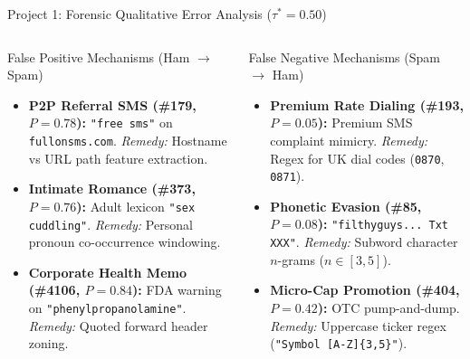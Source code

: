 \documentclass[aspectratio=169,10pt]{beamer}
\begin{document}
\begin{frame}{Project 1: Forensic Qualitative Error Analysis ($\tau^*=0.50$)}
\begin{columns}
\begin{block}{False Positive Mechanisms (Ham $\to$ Spam)}
\scriptsize
\begin{itemize}
  \item \textbf{P2P Referral SMS (\#179, $P=0.78$):} \texttt{"free sms"} on \texttt{fullonsms.com}. \textit{Remedy:} Hostname vs URL path feature extraction.
  \item \textbf{Intimate Romance (\#373, $P=0.76$):} Adult lexicon \texttt{"sex cuddling"}. \textit{Remedy:} Personal pronoun co-occurrence windowing.
  \item \textbf{Corporate Health Memo (\#4106, $P=0.84$):} FDA warning on \texttt{"phenylpropanolamine"}. \textit{Remedy:} Quoted forward header zoning.
\end{itemize}
\end{block}
\begin{block}{False Negative Mechanisms (Spam $\to$ Ham)}
\scriptsize
\begin{itemize}
  \item \textbf{Premium Rate Dialing (\#193, $P=0.05$):} Premium SMS complaint mimicry. \textit{Remedy:} Regex for UK dial codes (\texttt{0870}, \texttt{0871}).
  \item \textbf{Phonetic Evasion (\#85, $P=0.08$):} \texttt{"filthyguys... Txt XXX"}. \textit{Remedy:} Subword character $n$-grams ($n \in [3, 5]$).
  \item \textbf{Micro-Cap Promotion (\#404, $P=0.42$):} OTC pump-and-dump. \textit{Remedy:} Uppercase ticker regex (\texttt{"Symbol [A-Z]\{3,5\}"}).
\end{itemize}
\end{block}
\end{columns}
\end{frame}
\end{document}

